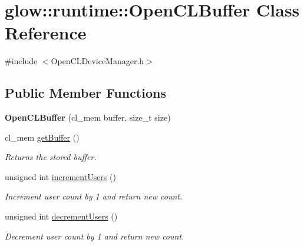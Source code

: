 \hypertarget{classglow_1_1runtime_1_1_open_c_l_buffer}{}\section{glow\+:\+:runtime\+:\+:Open\+C\+L\+Buffer Class Reference}
\label{classglow_1_1runtime_1_1_open_c_l_buffer}


{\ttfamily \#include $<$Open\+C\+L\+Device\+Manager.\+h$>$}

\subsection*{Public Member Functions}
\begin{DoxyCompactItemize}
\item 
\mbox{\label{classglow_1_1runtime_1_1_open_c_l_buffer_a1215b43783cc10b07353347e0e4de229}} 
{\bfseries Open\+C\+L\+Buffer} (cl\+\_\+mem buffer, size\+\_\+t size)
\item 
\mbox{\label{classglow_1_1runtime_1_1_open_c_l_buffer_a3c3df21a16d85b19cf24f920633ccbd5}} 
cl\+\_\+mem \hyperlink{classglow_1_1runtime_1_1_open_c_l_buffer_a3c3df21a16d85b19cf24f920633ccbd5}{get\+Buffer} ()
\begin{DoxyCompactList}\small\item\em Returns the stored buffer. \end{DoxyCompactList}\item 
\mbox{\label{classglow_1_1runtime_1_1_open_c_l_buffer_ab4957190604c5995174144eb8036b7ce}} 
unsigned int \hyperlink{classglow_1_1runtime_1_1_open_c_l_buffer_ab4957190604c5995174144eb8036b7ce}{increment\+Users} ()
\begin{DoxyCompactList}\small\item\em Increment user count by 1 and return new count. \end{DoxyCompactList}\item 
\mbox{\label{classglow_1_1runtime_1_1_open_c_l_buffer_a00a6739eeb56d5f9180a7a02177a3327}} 
unsigned int \hyperlink{classglow_1_1runtime_1_1_open_c_l_buffer_a00a6739eeb56d5f9180a7a02177a3327}{decrement\+Users} ()
\begin{DoxyCompactList}\small\item\em Decrement user count by 1 and return new count. \end{DoxyCompactList}\item 

\end{DoxyCompactItemize}
